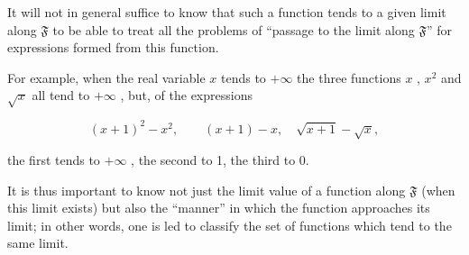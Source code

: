 It will not in general suffice to know that such a function tends to a given limit along \(\mathfrak{F}\) to be able to treat all the problems of ``passage to the limit along \(\mathfrak{F}\)'' for expressions formed from this function.

For example, when the real variable \(x\) tends to \(+\infty\) the three functions \(x\) , \(x^2\) and \(\sqrt{x}\) all tend to \(+\infty\) , but, of the expressions

\[
(x + 1) ^ {2} - x ^ {2}, \qquad (x + 1) - x, \quad \sqrt {x + 1} - \sqrt {x},
\]

the first tends to \(+\infty\) , the second to 1, the third to 0.

It is thus important to know not just the limit value of a function along \(\mathfrak{F}\) (when this limit exists) but also the ``manner'' in which the function approaches its limit; in other words, one is led to classify the set of functions which tend to the same limit.
